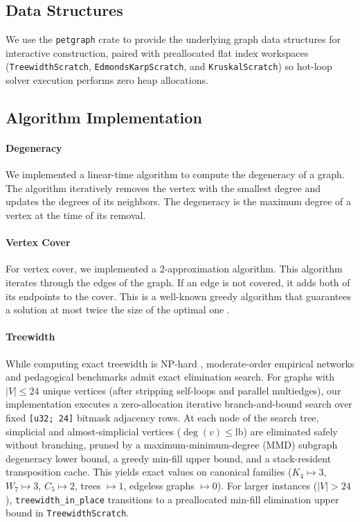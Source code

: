 \documentclass{article}
\begin{document}
\subsection{Data Structures}
We use the \texttt{petgraph} crate to provide the underlying graph data structures for interactive construction, paired with preallocated flat index workspaces (\texttt{TreewidthScratch}, \texttt{EdmondsKarpScratch}, and \texttt{KruskalScratch}) so hot-loop solver execution performs zero heap allocations.

\subsection{Algorithm Implementation}
\paragraph{Degeneracy} We implemented a linear-time algorithm to compute the degeneracy of a graph. The algorithm iteratively removes the vertex with the smallest degree and updates the degrees of its neighbors. The degeneracy is the maximum degree of a vertex at the time of its removal.

\paragraph{Vertex Cover} For vertex cover, we implemented a 2-approximation algorithm. This algorithm iterates through the edges of the graph. If an edge is not covered, it adds both of its endpoints to the cover. This is a well-known greedy algorithm that guarantees a solution at most twice the size of the optimal one \cite{bafna1999}.

\paragraph{Treewidth} While computing exact treewidth is NP-hard \cite{downey1999parameterized, betzler2012}, moderate-order empirical networks and pedagogical benchmarks admit exact elimination search. For graphs with $|V| \le 24$ unique vertices (after stripping self-loops and parallel multiedges), our implementation executes a zero-allocation iterative branch-and-bound search over fixed \texttt{[u32; 24]} bitmask adjacency rows. At each node of the search tree, simplicial and almost-simplicial vertices ($\deg(v) \le \text{lb}$) are eliminated safely without branching, pruned by a maximum-minimum-degree (MMD) subgraph degeneracy lower bound, a greedy min-fill upper bound, and a stack-resident transposition cache. This yields exact values on canonical families ($K_4 \mapsto 3$, $W_7 \mapsto 3$, $C_5 \mapsto 2$, trees $\mapsto 1$, edgeless graphs $\mapsto 0$). For larger instances ($|V| > 24$), \texttt{treewidth\_in\_place} transitions to a preallocated min-fill elimination upper bound in \texttt{TreewidthScratch}.
\end{document}
